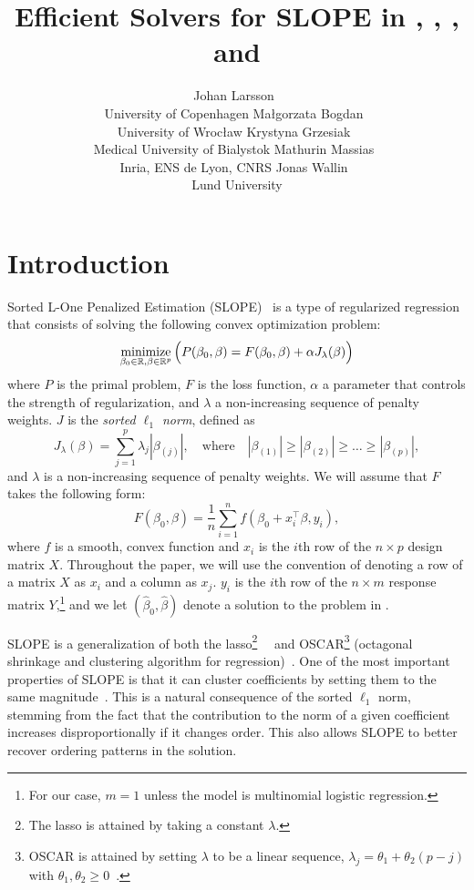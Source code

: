 \documentclass[article]{jss}
\author{
  Johan Larsson~\orcidlink{0000-0002-4029-5945}\\University of Copenhagen
  \And
  Ma\l{}gorzata Bogdan~\orcidlink{0000-0001-6355-8261}\\University of Wroc\l{}aw
  \And
  Krystyna Grzesiak~\orcidlink{0000-0003-2581-7722}\\Medical University of Bialystok
  \AND
  Mathurin Massias~\orcidlink{0000-0002-8950-0356}\\Inria, ENS de Lyon, CNRS
  \And
  Jonas Wallin~\orcidlink{0000-0003-0381-6593}\\Lund University
}
\title{Efficient Solvers for SLOPE in \proglang{R}, \proglang{Python}, \proglang{Julia}, and \proglang{C++}}
\let\Cref\crtCref
\begin{document}
\section{Introduction}

Sorted L-One Penalized Estimation
(SLOPE)~\citep{bogdan2013,zeng2014,bogdan2015} is a type of regularized
regression that consists of solving the following convex optimization problem:
\begin{equation}
  \label{eq:slope}
  \operatorname*{minimize}_{\beta_0 \in \mathbb{R},\beta \in \mathbb{R}^p}
  \Big(
  P(\beta_0,\beta)
  = F(\beta_0, \beta) + \alpha J_{\lambda}(\beta)
  \Big)
\end{equation}
where \(P\) is the primal problem, \(F\) is the loss function, \(\alpha\) a parameter
that controls the strength of regularization, and \(\lambda\) a non-increasing sequence of penalty weights. \(J\) is the
\emph{sorted $\ell_1$ norm}, defined as
\begin{equation}
  \label{eq:sl1}
  J_{\lambda}(\beta) = \sum_{j=1}^p \lambda_j |\beta_{(j)}|, \quad
  \text{where}\quad |\beta_{(1)}| \geq |\beta_{(2)}| \geq \ldots \geq
  |\beta_{(p)}|,
\end{equation}
and \(\lambda\) is a non-increasing sequence of penalty weights. We will
assume that \(F\) takes the following form:
\[
  F(\beta_0, \beta) = \frac{1}{n} \sum_{i=1}^n f(\beta_0 + x_i^\intercal \beta, y_i),
\]
where \(f\) is a smooth, convex function and \(x_i\) is the \(i\)th row of the
\(n \times p\) design matrix \(X\). Throughout the paper, we will use the
convention of denoting a row of a matrix \(X\) as \(x_i\) and a column as
\(x_j\). \(y_i\) is the \(i\)th row of the \(n \times m\) response matrix
\(Y\),\footnote{For our case, \(m = 1\) unless the model is multinomial
  logistic regression.}
and we let \((\hat{\beta}_0,
\hat{\beta})\) denote a solution to the problem in \Cref{eq:slope}.

SLOPE is a generalization of both the lasso\footnote{The lasso is attained by
  taking a constant
  \(\lambda\).}~~\citep{santosa1986,donoho1994,donoho1995,tibshirani1996} and
OSCAR\footnote{OSCAR is attained by setting \(\lambda\) to be a linear
  sequence, \(\lambda_j = \theta_1 + \theta_2(p - j)\) with \(\theta_1,
  \theta_2 \geq 0\)~\citep{figueiredo2014}.} (octagonal shrinkage and clustering
algorithm for regression)~\citep{bondell2008}.
One of the most important properties of SLOPE is that it can cluster coefficients by
setting them to the same magnitude~\citep{figueiredo2016,bogdan2022}. This is a natural
consequence of the sorted \(\ell_1\) norm, stemming from the fact that
the contribution to the norm of a given coefficient increases disproportionally if it
changes order. This also allows SLOPE to better recover ordering patterns
in the solution.
\end{document}
